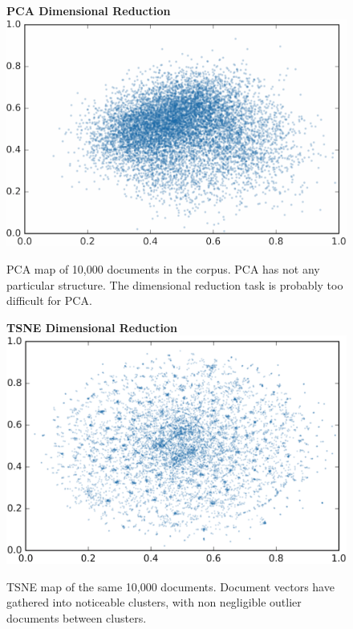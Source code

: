 \begin{figure}[H]
  \centering
  \begin{minipage}[b]{0.49\textwidth}
\textbf{PCA Dimensional Reduction}    
    \includegraphics[width=\textwidth]{Validation/pca2.png}
    \caption[PCA Dimensional Reduction]{PCA map of 10,000 documents in the corpus. PCA has not any particular structure. The dimensional reduction task is probably too difficult for PCA.}
      \label{fig:PCA_snap}
  \end{minipage}
  \hfill
  \begin{minipage}[b]{0.49\textwidth}
  \textbf{TSNE Dimensional Reduction}
    \includegraphics[width=\textwidth]{Validation/tsne2.png}
    \caption[TSNE Dimensional Reduction]{TSNE map of the same 10,000 documents. Document vectors have gathered into noticeable clusters, with non negligible outlier documents between clusters. }
      \label{fig:TSNE_snap}

  \end{minipage}
\end{figure}
